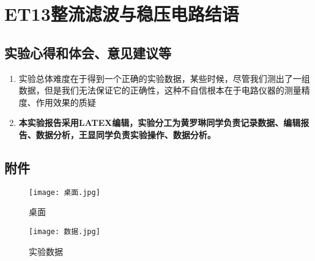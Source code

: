 \documentclass[dvipsnames, svgnames,a4paper,11pt]{article}
\begin{document}
	
	\clearpage
	
	\section{ET13整流滤波与稳压电路\quad\heiti 结语}
	
	\subsection{实验心得和体会、意见建议等}
	\begin{enumerate}
		\item 实验总体难度在于得到一个正确的实验数据，某些时候，尽管我们测出了一组数据，但是我们无法保证它的正确性，这种不自信根本在于电路仪器的测量精度、作用效果的质疑
		\item \textbf{本实验报告采用LATEX编辑，实验分工为黄罗琳同学负责记录数据、编辑报告、数据分析，王显同学负责实验操作、数据分析。}
	\end{enumerate}
	

	\subsection{附件}
	\begin{figure}[{H}]
		\centering
		\texttt{[image: 桌面.jpg]}
		\caption{桌面}
		\label{}
	\end{figure}
	\begin{figure}[{H}]
		\centering
		\texttt{[image: 数据.jpg]}
		\caption{实验数据}
		\label{}
	\end{figure}
	
	
\end{document}
